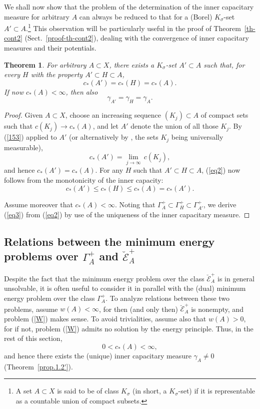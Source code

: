 \documentclass[12pt,a4paper,reqno]{amsart} %
\theoremstyle{lause}
\theoremstyle{maaritelma}
\theoremstyle{lause}
\newtheorem{theorem}{Theorem}[section]
\theoremstyle{maaritelma}
\numberwithin{equation}{section}
\begin{document}
We shall now show that the problem of the determination of the inner capacitary measure for arbitrary $A$ can always be reduced to that for a (Borel) $K_\sigma$-set $A'\subset A$.\footnote{A set $A\subset X$ is said to be of class $K_\sigma$ (in short, a $K_\sigma$-set) if it is representable as a countable union of compact subsets.} This observation will be particularly useful in the proof of Theorem~\ref{th-cont2} (Sect.~\ref{proof-th-cont2}), dealing with the convergence of inner capacitary measures and their potentials.

\begin{theorem}\label{th-count}For arbitrary\/ $A\subset X$, there exists a\/ $K_\sigma$-set\/ $A'\subset A$ such that, for every\/ $H$ with the property\/ $A'\subset H\subset A$,
\begin{equation}\label{eq2}c_*(A')=c_*(H)=c_*(A).\end{equation}
If now\/ $c_*(A)<\infty$, then also
\begin{equation}\label{eq3}\gamma_{A'}=\gamma_H=\gamma_A.\end{equation}
\end{theorem}

\begin{proof} Given $A\subset X$, choose an increasing sequence $(K_j)\subset A$ of compact sets such that $c(K_j)\to c_*(A)$,
and let $A'$ denote the union of all those $K_j$.
By (\ref{153}) applied to $A'$ (or alternatively by \cite[Lemma~2.3.3]{F1}, the sets $K_j$ being universally measurable),
\[c_*(A')=\lim_{j\to\infty}\,c(K_j),\]
and hence $c_*(A')=c_*(A)$. For any $H$ such that $A'\subset H\subset A$, (\ref{eq2}) now follows
from the monotonicity of the inner capacity:
\[c_*(A')\leqslant c_*(H)\leqslant c_*(A)=c_*(A').\]

Assume moreover that $c_*(A)<\infty$. Noting that $\Gamma_A^+\subset\Gamma_H^+\subset\Gamma_{A'}^+$, we derive (\ref{eq3}) from (\ref{eq2}) by use of the uniqueness of the inner capacitary measure.
\end{proof}

\subsection{Relations between the minimum energy problems over $\Gamma^+_A$ and $\breve{\mathcal E}^+_A$}\label{sec-rel}
Despite the fact that the minimum energy problem over the class $\breve{\mathcal E}^+_A$ is in general unsolvable, it is often useful to consider it in parallel with the (dual) minimum energy problem over the class $\Gamma^+_A$.
To analyze relations between these two problems, assume $w(A)<\infty$, for then (and only then) $\breve{\mathcal E}^+_A$ is nonempty, and problem (\ref{W}) makes sense.
To avoid trivialities, assume also that $w(A)>0$, for if not, problem (\ref{W}) admits no solution by the energy principle. Thus, in the rest of this section,
\begin{equation}\label{ASS}0<c_*(A)<\infty,\end{equation}
and hence there exists the (unique) inner capacitary measure $\gamma_A\ne0$ (Theorem~\ref{prop.1.2'}).
\end{document}
